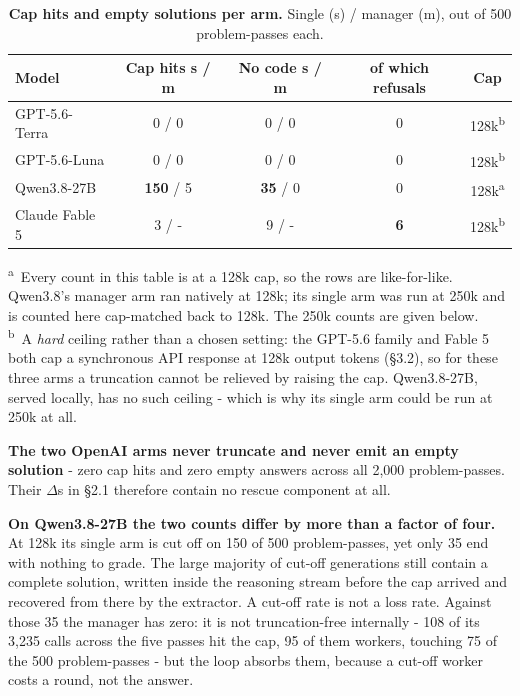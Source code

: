 \documentclass[11pt]{article}
\begin{document}
\begin{table}[htbp]
\centering
\caption{\textbf{Cap hits and empty solutions per arm.} Single (s) / manager (m), out of
500 problem-passes each.}
\small
\begin{tabular}{@{}lcccc@{}}
\toprule
\textbf{Model} & \textbf{Cap hits s / m} & \textbf{No code s / m} &
\textbf{of which refusals} & \textbf{Cap} \\
\midrule
GPT-5.6-Terra  & 0 / 0            & 0 / 0          & 0 & 128k\textsuperscript{b} \\
GPT-5.6-Luna   & 0 / 0            & 0 / 0          & 0 & 128k\textsuperscript{b} \\
Qwen3.8-27B    & \textbf{150} / 5 & \textbf{35} / 0 & 0 & 128k\textsuperscript{a} \\
Claude Fable 5 & 3 / -            & 9 / -          & \textbf{6} & 128k\textsuperscript{b} \\
\bottomrule
\end{tabular}

\vspace{0.6ex}
\begin{minipage}{0.92\linewidth}
\footnotesize
\textsuperscript{a}~Every count in this table is at a 128k cap, so the rows are
like-for-like. Qwen3.8's manager arm ran natively at 128k; its single arm was run at 250k
and is counted here cap-matched back to 128k. The 250k counts are given below.\\
\textsuperscript{b}~A \textit{hard} ceiling rather than a chosen setting: the GPT-5.6
family and Fable 5 both cap a synchronous API response at 128k output tokens (\S3.2), so
for these three arms a truncation cannot be relieved by raising the cap. Qwen3.8-27B, served
locally, has no such ceiling - which is why its single arm could be run at 250k at all.
\end{minipage}
\end{table}

\textbf{The two OpenAI arms never truncate and never emit an empty solution} - zero cap
hits and zero empty answers across all 2{,}000 problem-passes. Their $\Delta$s in \S2.1
therefore contain no rescue component at all.

\textbf{On Qwen3.8-27B the two counts differ by more than a factor of four.} At 128k its single arm is
cut off on 150 of 500 problem-passes, yet only 35 end with nothing to
grade. The large majority of cut-off generations still contain a complete solution, written
inside the reasoning stream before the cap arrived and recovered from there by the
extractor. A cut-off rate is not a loss rate. Against those 35 the manager has zero: it is not truncation-free
internally - 108 of its 3{,}235 calls across the five passes hit the cap, 95 of them
workers, touching 75 of the 500 problem-passes - but the loop
absorbs them, because a cut-off worker costs a round, not the answer.
\end{document}
